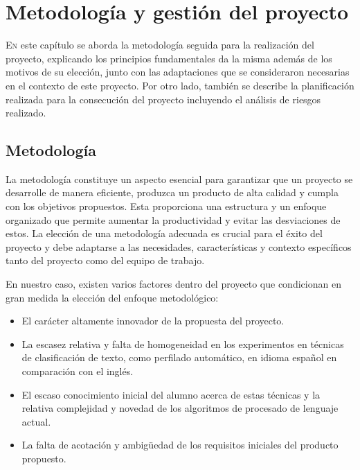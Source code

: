 \chapter{Metodología y gestión del proyecto}
\label{chap:metodologia}
\lettrine{E}{n} este capítulo se aborda la metodología seguida para la realización del proyecto, explicando los principios fundamentales da la misma además de los motivos de su elección, junto con las adaptaciones que se consideraron necesarias en el contexto de este proyecto. Por otro lado, también se describe la planificación realizada para la consecución del proyecto incluyendo el análisis de riesgos realizado.

\section{Metodología}

La metodología constituye un aspecto esencial para garantizar que un proyecto se desarrolle de manera eficiente, produzca un producto de alta calidad y cumpla con los objetivos propuestos. Esta proporciona una estructura y un enfoque organizado que permite aumentar la productividad y evitar las desviaciones de estos. La elección de una metodología adecuada es crucial para el éxito del proyecto y debe adaptarse a las necesidades, características y contexto específicos tanto del proyecto como del equipo de trabajo.

En nuestro caso, existen varios factores dentro del proyecto que condicionan en gran medida la elección del enfoque metodológico:

\begin{itemize}
    \item El carácter altamente innovador de la propuesta del proyecto.
    \item La escasez relativa y falta de homogeneidad en los experimentos en técnicas de clasificación de texto, como perfilado automático, en idioma español en comparación con el inglés.
    \item El escaso conocimiento inicial del alumno acerca de estas técnicas y la relativa complejidad y novedad de los algoritmos de procesado de lenguaje actual.
    \item La falta de acotación y ambigüedad de los requisitos iniciales del producto propuesto.
\end{itemize}


